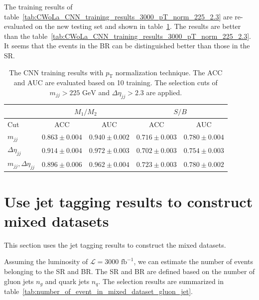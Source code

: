 \documentclass[12pt]{article}
\begin{document}
        The training results of table~\ref{tab:CWoLa_CNN_training_results_3000_pT_norm_225_2.3} are re-evaluated on the new testing set and shown in table~\ref{tab:CWoLa_CNN_training_results_3000_pT_norm_225_2.3_new_test_set}. The results are better than the table~\ref{tab:CWoLa_CNN_training_results_3000_pT_norm_225_2.3}. It seems that the events in the BR can be distinguished better than those in the SR.
    \begin{table}[htpb]
        \centering
        \caption{The CNN training results with $p_{\text{T}}$ normalization technique. The ACC and AUC are evaluated based on 10 training. The selection cuts of $m_{jj} > \text{225 GeV}$ and $\Delta\eta_{jj} > 2.3$ are applied.}
        \label{tab:CWoLa_CNN_training_results_3000_pT_norm_225_2.3_new_test_set}
        \begin{tabular}{l|cc|cc}
                                      & \multicolumn{2}{c|}{$M_1 / M_2$}      & \multicolumn{2}{c}{$S / B$}           \\ \hline
            Cut                       & ACC               & AUC               & ACC               & AUC               \\ \hline
            $m_{jj}$                  & $0.863 \pm 0.004$ & $0.940 \pm 0.002$ & $0.716 \pm 0.003$ & $0.780 \pm 0.004$ \\
            $\Delta\eta_{jj}$         & $0.914 \pm 0.004$ & $0.972 \pm 0.003$ & $0.702 \pm 0.003$ & $0.754 \pm 0.003$ \\
            $m_{jj}, \Delta\eta_{jj}$ & $0.896 \pm 0.006$ & $0.962 \pm 0.004$ & $0.723 \pm 0.003$ & $0.780 \pm 0.002$
        \end{tabular}
    \end{table}
\section{Use jet tagging results to construct mixed datasets}%
\label{sec:use_jet_tagging_results_to_construct_mixed_datasets}
    This section uses the jet tagging results to construct the mixed datasets.

    Assuming the luminosity of $\mathcal{L} = \text{3000 fb}^{-1}$, we can estimate the number of events belonging to the SR and BR. The SR and BR are defined based on the number of gluon jets $n_g$ and quark jets $n_q$. The selection results are summarized in table~\ref{tab:number_of_event_in_mixed_dataset_gluon_jet}.
\end{document}
